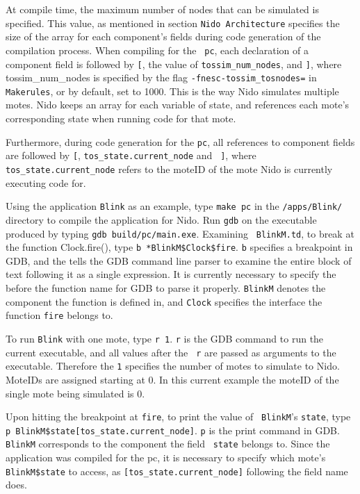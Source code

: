\documentclass[10pt]{article}
\begin{document}
At compile time, the maximum number of nodes that can be simulated is
specified.  This value, as mentioned in section
{\tt Nido Architecture} specifies the size of the array for each component's fields during code
generation of the compilation process. When compiling for the {\tt
pc}, each declaration of a component field is followed by {\tt [}, the
value of {\tt tossim\_num\_nodes}, and {\tt ]}, where tossim\_num\_nodes
is specified by the flag {\tt -fnesc-tossim\_tosnodes=} in {\tt
Makerules}, or by default, set
to 1000.  This is the way Nido simulates multiple
motes. Nido keeps an array for each variable of state, and references
each mote's corresponding state when running code for that mote.

Furthermore, during code generation for the {\tt pc}, all references to component
fields are followed by {\tt [}, {\tt tos\_state.current\_node} and {\tt
]}, where {\tt tos\_state.current\_node} refers to the moteID of
the mote Nido is currently executing code for.

Using the application {\tt Blink} as an example, type {\tt make pc} in
the {\tt /apps/Blink/} directory to compile the application for Nido. Run {\tt gdb} on the executable
produced by typing {\tt gdb build/pc/main.exe}. Examining {\tt
BlinkM.td}, to break at the function Clock.fire(), type {\tt b
*BlinkM\$Clock\$fire}. {\tt b} specifies a breakpoint in GDB, and the
{\tt *} tells the GDB command line parser to examine the entire block of text
following it as a single expression. It is currently necessary to
specify the {\tt *} before the function name for GDB to parse it
properly. {\tt BlinkM} denotes the component the function is defined
in, and {\tt Clock} specifies the interface the function {\tt fire}
belongs to.

To run {\tt Blink} with one mote, type {\tt r 1}.  {\tt r} is the GDB
command to run the current executable, and all values after the {\tt
r} are passed as arguments to the executable. Therefore the {\tt 1}
specifies the number of motes to simulate to Nido. MoteIDs are
assigned starting at 0.  In this current example the moteID of the
single mote being simulated is 0.  

Upon hitting the breakpoint at {\tt fire}, to print the value of {\tt
BlinkM}'s {\tt state}, type \\{\tt p
BlinkM\$state[tos\_state.current\_node]}. {\tt p} is the print command
in GDB. {\tt BlinkM} corresponds to the component the field {\tt
state} belongs to. Since the application was compiled for the pc,
it is necessary to specify which mote's {\tt BlinkM\$state} to
access, as {\tt [tos\_state.current\_node]} following the field name does. 
\end{document}
